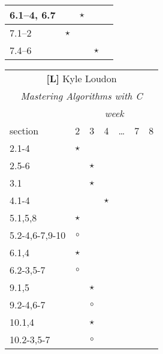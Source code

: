 \documentclass[a4paper]{article}
\newcommand{\refl}{\textbf{[L]}\xspace}
\begin{document}
\begin{table}
\begin{minipage}[t]{0.5\columnwidth}
\begin{tabular}{|l|c|c|c|c|}
    \hline
    6.1--4, 6.7        &         & $\star$ &         & \\
    \hline
    7.1--2             & $\star$ &         &         & \\
    7.4--6             &         &         & $\star$ & \\
    \hline
  \end{tabular}
  \end{minipage}
  \hfill
  \begin{minipage}[t]{0.5\columnwidth}
  \begin{tabular}{|l|c|c|c|c|c|c|}
    \hline
    \multicolumn{7}{|c|}{\refl Kyle Loudon} \\
    \multicolumn{7}{|c|}{\emph{Mastering Algorithms with C}} \\
    \hline
                       & \multicolumn{6}{|c|}{\emph{week}} \\
    section            & 2       & 3       & 4       & \ldots  & 7       & 8       \\
    \hline
    2.1-4              & $\star$ &         &         &         &         &         \\
    2.5-6              &         & $\star$ &         &         &         &         \\
    \hline
    3.1                &         & $\star$ &         &         &         &         \\
    \hline
    4.1-4              &         &         & $\star$ &         &         &         \\
    \hline
    5.1,5,8            & $\star$ &         &         &         &         &         \\
    5.2-4,6-7,9-10     & $\circ$ &         &         &         &         &         \\
    \hline
    6.1,4              & $\star$ &         &         &         &         &         \\
    6.2-3,5-7          & $\circ$ &         &         &         &         &         \\
    \hline
    9.1,5              &         & $\star$ &         &         &         &         \\
    9.2-4,6-7          &         & $\circ$ &         &         &         &         \\
    \hline
    10.1,4             &         & $\star$ &         &         &         &         \\
    10.2-3,5-7         &         & $\circ$ &         &         &         &         \\

\end{tabular}
\end{minipage}
\end{table}
\end{document}
